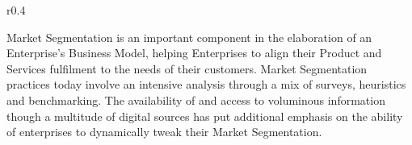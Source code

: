 %
%

\begin{wrapfigure}[12]{r}{0.4\textwidth}
    \vspace{-12pt}
    \begin{center}
        \begin{tcolorbox}[colback=secondary!5,colframe=secondary!60]
        \end{tcolorbox}
    \end{center}
\end{wrapfigure}

Market Segmentation is an important component in the elaboration of an Enterprise’s Business Model,
helping Enterprises to align their Product and Services fulfilment to the needs of their customers.
Market Segmentation practices today involve an intensive analysis through a mix of surveys,
heuristics and benchmarking.
The availability of and access to voluminous information though a multitude of digital sources has put
additional emphasis on the ability of enterprises to dynamically tweak their Market Segmentation.



